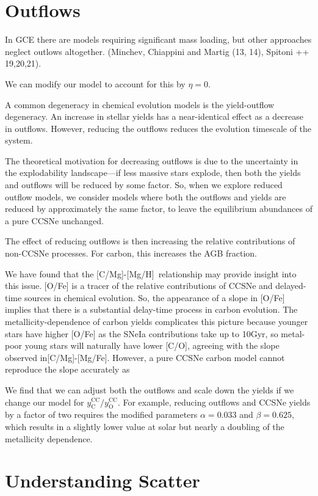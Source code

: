 \documentclass[12pt,oneside]{report}
\newcommand{\caah}{[C/Mg]-[Mg/H]}
\newcommand{\caafe}{[C/Mg]-[Mg/Fe]}
\begin{document}
\section{Outflows}

In GCE there are models requiring significant mass loading, but other approaches neglect outlows altogether. (Minchev, Chiappini and Martig (13, 14), Spitoni ++ 19,20,21). 

We can modify our model to account for this by $\eta=0$. 

A common degeneracy in chemical evolution models is the yield-outflow degeneracy. An increase in stellar yields has a near-identical effect as a decrease in outflows. However, reducing the outflows reduces the evolution timescale of the system. 

The theoretical motivation for decreasing outflows is due to the uncertainty in the explodability landscape---if less massive stars explode, then both the yields and outflows will be reduced by some factor. So, when we explore reduced outflow models, we consider models where both the outflows and yields are reduced by approximately the same factor, to leave the equilibrium abundances of a pure CCSNe unchanged. 

The effect of reducing outflows is then increasing the relative contributions of non-CCSNe processes. For carbon, this increases the AGB fraction.

We have found that the \caah~relationship may provide insight into this issue. [O/Fe] is a tracer of the relative contributions of CCSNe and delayed-time sources in chemical evolution. So, the appearance of a slope in [O/Fe] implies that there is a substantial delay-time process in carbon evolution. 
The metallicity-dependence of carbon yields complicates this picture because
younger stars have higher [O/Fe] as the SNeIa contributions take up to 10Gyr,
so metal-poor young stars will naturally have lower [C/O], agreeing with the
slope observed in\caafe. However, a pure CCSNe carbon model cannot reproduce the slope accurately as  


We find that we can adjust both the outflows and scale down the yields if we change our model for $y_\text{C}^\text{CC}/y_\text{O}^\text{CC}$. For example, reducing outflows and CCSNe yields by a factor of two requires the modified parameters
$\alpha = 0.033$ and $\beta = 0.625$, which results in a slightly lower value at solar but nearly a doubling of the metallicity dependence.

\section{Understanding Scatter}
\end{document}
